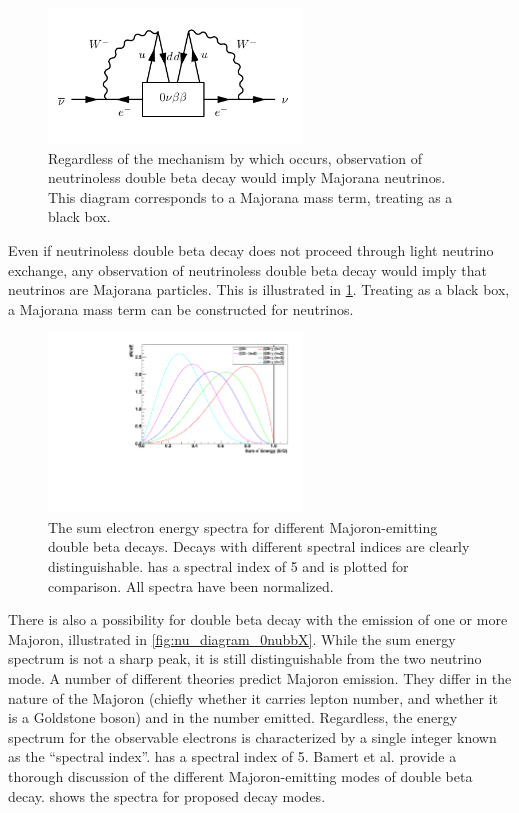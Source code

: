 \documentclass[herrin-thesis.tex]{subfiles}
\begin{document}
\begin{figure}[htb]
	\centering
	\includegraphics[width=0.6\textwidth]{./feynman_diagrams/zeronubetabeta_blackbox.pdf}
	\caption[Observation of \zeronu{} implies to Majorana neutrinos]{Regardless of the mechanism by which \zeronu{} occurs, observation of neutrinoless double beta decay would imply Majorana neutrinos. This diagram corresponds to a Majorana mass term, treating \zeronu{} as a black box.}
	\label{fig:nu_blackbox}
\end{figure}

Even if neutrinoless double beta decay does not proceed through light neutrino exchange, any observation of neutrinoless double beta decay would imply that neutrinos are Majorana particles. This is illustrated in \cref{fig:nu_blackbox}. Treating \zeronu{} as a black box, a Majorana mass term can be constructed for neutrinos.

\begin{figure}[htb]
	\centering
	\includegraphics[width=0.6\textwidth]{./plots/nu_majoron_spectra}
	\caption[Spectra for Majoron-emitting double beta decay modes]{The sum electron energy spectra for different Majoron-emitting double beta decays. Decays with different spectral indices are clearly distinguishable. \twonu{} has a spectral index of 5 and is plotted for comparison. All spectra have been normalized.}
	\label{fig:nu_majoron_spectra}
\end{figure}

There is also a possibility for double beta decay with the emission of one or more Majoron, illustrated in \cref{fig:nu_diagram_0nubbX}. While the sum energy spectrum is not a sharp peak, it is still distinguishable from the two neutrino mode. A number of different theories predict Majoron emission. They differ in the nature of the Majoron (chiefly whether it carries lepton number, and whether it is a Goldstone boson) and in the number emitted. Regardless, the energy spectrum for the observable electrons is characterized by a single integer known as the ``spectral index''. \twonu{} has a spectral index of 5. Bamert et al.\cite{Bamert:1995fk} provide a thorough discussion of the different Majoron-emitting modes of double beta decay.  shows the spectra for proposed decay modes.
\end{document}
